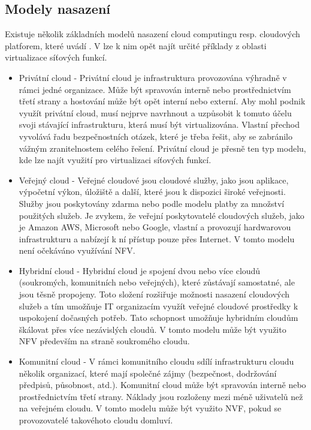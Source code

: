 \subsection{Modely nasazení}

Existuje několik základních modelů nasazení cloud computingu resp. cloudových platforem, které uvádí \cite{CloudSurvey}. V \cite{NFV_use_cases} lze k nim opět najít určité příklady z oblasti virtualizace síťových funkcí.

\begin{itemize}
\item Privátní cloud - Privátní cloud je  infrastruktura  provozována  výhradně  v  rámci  jedné  organizace. Může být spravován interně nebo prostřednictvím třetí strany a hostování může být opět interní nebo externí.  Aby  mohl  podnik  využít  privátní  cloud,  musí  nejprve  navrhnout a uzpůsobit k tomuto účelu svoji stávající infrastrukturu, která musí být virtualizována.  Vlastní  přechod  vyvolává  řadu  bezpečnostních  otázek,  které  je třeba řešit, aby se zabránilo vážným zranitelnostem celého řešení. Privátní cloud je přesně ten typ modelu, kde lze najít využití pro virtualizaci síťových funkcí.
\item Veřejný cloud - Veřejné cloudové jsou cloudové služby, jako jsou aplikace, výpočetní výkon, úložiště a další, které jsou k dispozici široké  veřejnosti.  Služby  jsou  poskytovány  zdarma  nebo  podle modelu  platby  za  množství  použitých  služeb.  Je  zvykem,  že  veřejní  poskytovatelé cloudových  služeb,  jako  je  Amazon  AWS,  Microsoft  nebo  Google,  vlastní  a  provozují hardwarovou infrastrukturu a nabízejí k ní přístup pouze přes Internet. V tomto modelu není očekáváno využívání NFV.
\item Hybridní cloud - Hybridní  cloud je  spojení  dvou  nebo  více  cloudů  (soukromých,  komunitních  nebo veřejných),  které  zůstávají  samostatné,  ale  jsou  těsně  propojeny.  Toto  složení  rozšiřuje možnosti  nasazení  cloudových  služeb  a  tím  umožňuje  IT  organizacím  využít  veřejné cloudové prostředky k uspokojení dočasných potřeb. Tato schopnost umožňuje hybridním cloudům škálovat přes více nezávislých cloudů. V tomto modelu může být využito NFV především na straně soukromého cloudu.
\item Komunitní cloud - V rámci komunitního cloudu sdílí infrastrukturu cloudu několik organizací, které mají společné zájmy (bezpečnost, dodržování předpisů, působnost, atd.). Komunitní cloud může být spravován interně nebo prostřednictvím třetí strany. Náklady jsou rozloženy mezi méně uživatelů než na veřejném cloudu. V tomto modelu může být využito NVF, pokud se provozovatelé takovéhoto cloudu domluví. 
\end{itemize}


